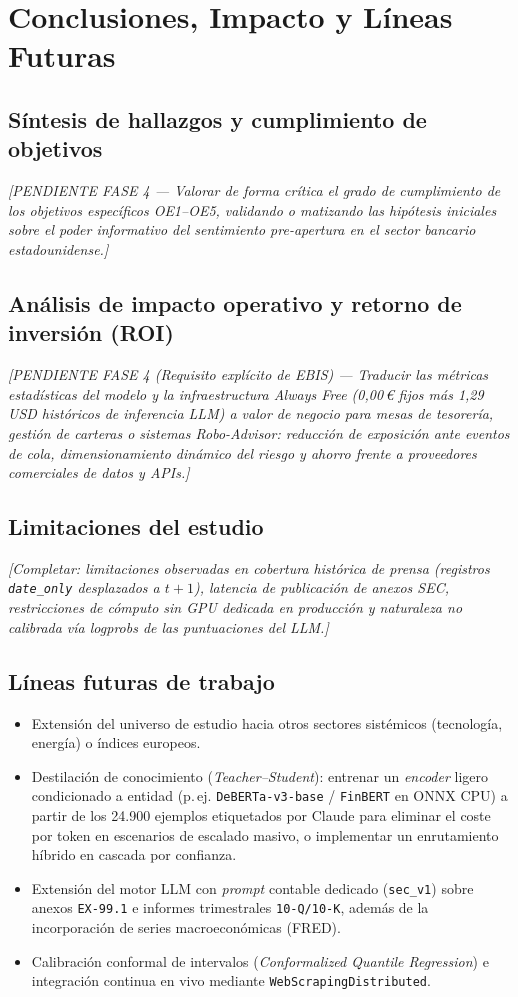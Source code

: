 \chapter{Conclusiones, Impacto y Líneas Futuras}

\section{Síntesis de hallazgos y cumplimiento de objetivos}
\textit{[PENDIENTE FASE 4 --- Valorar de forma crítica el grado de cumplimiento de los objetivos específicos OE1--OE5, validando o matizando las hipótesis iniciales sobre el poder informativo del sentimiento pre-apertura en el sector bancario estadounidense.]}

\section{Análisis de impacto operativo y retorno de inversión (ROI)}
\textit{[PENDIENTE FASE 4 (Requisito explícito de EBIS) --- Traducir las métricas estadísticas del modelo y la infraestructura \textit{Always Free} (0,00\,€ fijos más 1,29\,USD históricos de inferencia LLM) a valor de negocio para mesas de tesorería, gestión de carteras o sistemas \textit{Robo-Advisor}: reducción de exposición ante eventos de cola, dimensionamiento dinámico del riesgo y ahorro frente a proveedores comerciales de datos y APIs.]}

\section{Limitaciones del estudio}
\textit{[Completar: limitaciones observadas en cobertura histórica de prensa (registros \texttt{date\_only} desplazados a $t+1$), latencia de publicación de anexos SEC, restricciones de cómputo sin GPU dedicada en producción y naturaleza no calibrada vía \textit{logprobs} de las puntuaciones del LLM.]}

\section{Líneas futuras de trabajo}
\begin{itemize}
    \item Extensión del universo de estudio hacia otros sectores sistémicos (tecnología, energía) o índices europeos.
    \item Destilación de conocimiento (\textit{Teacher--Student}): entrenar un \textit{encoder} ligero condicionado a entidad (p.\,ej. \texttt{DeBERTa-v3-base} / \texttt{FinBERT} en ONNX CPU) a partir de los 24.900 ejemplos etiquetados por Claude para eliminar el coste por token en escenarios de escalado masivo, o implementar un enrutamiento híbrido en cascada por confianza.
    \item Extensión del motor LLM con \textit{prompt} contable dedicado (\texttt{sec\_v1}) sobre anexos \texttt{EX-99.1} e informes trimestrales \texttt{10-Q/10-K}, además de la incorporación de series macroeconómicas (FRED).
    \item Calibración conformal de intervalos (\textit{Conformalized Quantile Regression}) e integración continua en vivo mediante \texttt{WebScrapingDistributed}.
\end{itemize}
